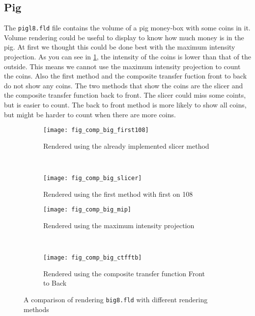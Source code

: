 \subsection{Pig}
The \texttt{pigl8.fld} file contains the volume of a pig money-box with some coins in it.
Volume rendering could be useful to display to know how much money is in the pig.
At first we thought this could be done best with the maximum intensity projection.
As you can see in \ref{fig:comp:big}, the intensity of the coins is lower than that of the outside. 
This means we cannot use the maximum intensity projection to count the coins. 
Also the first method and the composite transfer fuction front to back do not show any coins. 
The two methods that show the coins are the slicer and the composite transfer function back to front. 
The slicer could miss some coints, but is easier to count. 
The back to front method is more likely to show all coins, but might be harder to count when there are more coins. 
\begin{figure}[H]
	\centering
	\begin{subfigure}[t]{0.45\textwidth}
		\texttt{[image: fig\_comp\_big\_first108]}
		\caption{Rendered using the already implemented slicer method}
	\end{subfigure}
	~%
	\begin{subfigure}[t]{0.45\textwidth}
		\texttt{[image: fig\_comp\_big\_slicer]}
		\caption{Rendered using the first method with first on 108}
	\end{subfigure}
	
	\begin{subfigure}[t]{0.45\textwidth}
		\texttt{[image: fig\_comp\_big\_mip]}
		\caption{Rendered using the maximum intensity projection}
	\end{subfigure}
	~%
	\begin{subfigure}[t]{0.45\textwidth}
		\texttt{[image: fig\_comp\_big\_ctfftb]}
		\caption{Rendered using the composite transfer function Front to Back}
	\end{subfigure}
	\caption{A comparison of rendering \texttt{big8.fld} with different rendering methods}
	\label{fig:comp:big}
\end{figure}
	
